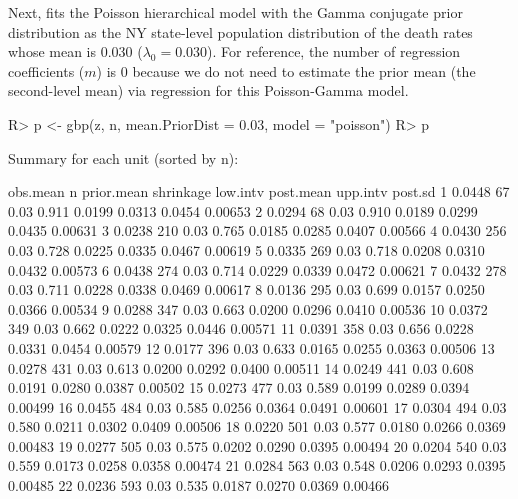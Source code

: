 \documentclass[article]{jss}
\begin{document}
Next,  fits the Poisson hierarchical model with the Gamma conjugate prior distribution as the NY state-level population distribution of the death rates whose mean is 0.030 ($\lambda_{0}=0.030$). For reference, the number of regression coefficients ($m$) is 0 because we do not need to estimate the prior mean (the second-level mean) via regression for this Poisson-Gamma model. 
\begin{CodeChunk}
\begin{CodeInput}
R> p <- gbp(z, n, mean.PriorDist = 0.03, model = "poisson")
R> p
\end{CodeInput}
\begin{CodeOutput}
Summary for each unit (sorted by n):

         obs.mean    n prior.mean shrinkage low.intv post.mean upp.intv post.sd
1          0.0448   67       0.03     0.911   0.0199    0.0313   0.0454 0.00653
2          0.0294   68       0.03     0.910   0.0189    0.0299   0.0435 0.00631
3          0.0238  210       0.03     0.765   0.0185    0.0285   0.0407 0.00566
4          0.0430  256       0.03     0.728   0.0225    0.0335   0.0467 0.00619
5          0.0335  269       0.03     0.718   0.0208    0.0310   0.0432 0.00573
6          0.0438  274       0.03     0.714   0.0229    0.0339   0.0472 0.00621
7          0.0432  278       0.03     0.711   0.0228    0.0338   0.0469 0.00617
8          0.0136  295       0.03     0.699   0.0157    0.0250   0.0366 0.00534
9          0.0288  347       0.03     0.663   0.0200    0.0296   0.0410 0.00536
10         0.0372  349       0.03     0.662   0.0222    0.0325   0.0446 0.00571
11         0.0391  358       0.03     0.656   0.0228    0.0331   0.0454 0.00579
12         0.0177  396       0.03     0.633   0.0165    0.0255   0.0363 0.00506
13         0.0278  431       0.03     0.613   0.0200    0.0292   0.0400 0.00511
14         0.0249  441       0.03     0.608   0.0191    0.0280   0.0387 0.00502
15         0.0273  477       0.03     0.589   0.0199    0.0289   0.0394 0.00499
16         0.0455  484       0.03     0.585   0.0256    0.0364   0.0491 0.00601
17         0.0304  494       0.03     0.580   0.0211    0.0302   0.0409 0.00506
18         0.0220  501       0.03     0.577   0.0180    0.0266   0.0369 0.00483
19         0.0277  505       0.03     0.575   0.0202    0.0290   0.0395 0.00494
20         0.0204  540       0.03     0.559   0.0173    0.0258   0.0358 0.00474
21         0.0284  563       0.03     0.548   0.0206    0.0293   0.0395 0.00485
22         0.0236  593       0.03     0.535   0.0187    0.0270   0.0369 0.00466

\end{CodeOutput}
\end{CodeChunk}
\end{document}
